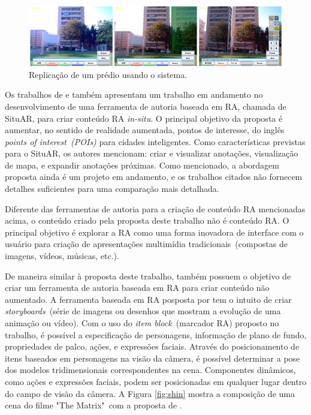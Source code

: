 \documentclass[../main.tex]{subfiles}
\begin{document}
\begin{figure}[!h]
\centering
\includegraphics[width=1\linewidth]{IMG/Relacionados/langlotz.png}
\caption{Replicação de um prédio usando o sistema.}
\label{fig:langlotz}
\end{figure}

Os trabalhos de  e  também apresentam um trabalho em andamento no desenvolvimento de uma ferramenta de autoria baseada em RA, chamada de SituAR, para criar conteúdo RA \emph{in-situ}. O principal objetivo da proposta é aumentar, no sentido de realidade aumentada, pontos de interesse, do inglês \emph{points of interest~(POIs)} para cidades inteligentes. Como características previstas para o SituAR, os autores mencionam: criar e visualizar anotações, visualização de mapa, e expandir anotações próximas. Como mencionado, a abordagem proposta ainda é um projeto em andamento, e os trabalhos citados não fornecem detalhes suficientes para uma comparação mais detalhada.

Diferente das ferramentas de autoria para a criação de conteúdo RA mencionadas acima, o conteúdo criado pela proposta deste trabalho não é conteúdo RA. O principal objetivo é explorar a RA como uma forma inovadora de interface com o usuário para criação de apresentações multimídia tradicionais~(compostas de imagens, vídeos, músicas, etc.).

De maneira similar à proposta deste trabalho,  também possuem o objetivo de criar um ferramenta de autoria baseada em RA para criar conteúdo não aumentado. A ferramenta baseada em RA posposta por  tem o intuito de criar \emph{storyboards}~(série de imagens ou desenhos que mostram a evolução de uma animação ou vídeo). Com o uso do \emph{item block}~(marcador RA) proposto no trabalho, é possível a especificação de personagens, informação de plano de fundo, propriedades de palco, ações, e expressões faciais. Através do posicionamento de itens baseados em personagens na visão da câmera, é possível determinar a pose dos modelos tridimensionais correspondentes na cena. Componentes dinâmicos, como ações e expressões faciais, podem ser posicionadas em qualquer lugar dentro do campo de visão da câmera. A Figura \ref{fig:shin} mostra a composição de uma cena do filme "The Matrix"~com a proposta de . 
\end{document}
